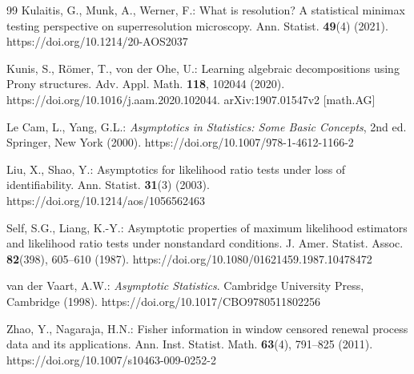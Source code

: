 \begin{thebibliography}{99}
Kulaitis, G., Munk, A., Werner, F.: What is resolution? A statistical minimax
testing perspective on superresolution microscopy. Ann. Statist.
\textbf{49}(4) (2021). https://doi.org/10.1214/20-AOS2037

Kunis, S., R\"omer, T., von der Ohe, U.: Learning algebraic decompositions
using Prony structures. Adv. Appl. Math. \textbf{118}, 102044 (2020).
https://doi.org/10.1016/j.aam.2020.102044. arXiv:1907.01547v2 [math.AG]

Le Cam, L., Yang, G.L.: \emph{Asymptotics in Statistics: Some Basic
Concepts}, 2nd ed. Springer, New York (2000).
https://doi.org/10.1007/978-1-4612-1166-2

Liu, X., Shao, Y.: Asymptotics for likelihood ratio tests under loss of
identifiability. Ann. Statist. \textbf{31}(3) (2003).
https://doi.org/10.1214/aos/1056562463

Self, S.G., Liang, K.-Y.: Asymptotic properties of maximum likelihood
estimators and likelihood ratio tests under nonstandard conditions.
J. Amer. Statist. Assoc. \textbf{82}(398), 605--610 (1987).
https://doi.org/10.1080/01621459.1987.10478472

van der Vaart, A.W.: \emph{Asymptotic Statistics}. Cambridge University
Press, Cambridge (1998). https://doi.org/10.1017/CBO9780511802256

Zhao, Y., Nagaraja, H.N.: Fisher information in window censored renewal
process data and its applications. Ann. Inst. Statist. Math. \textbf{63}(4),
791--825 (2011). https://doi.org/10.1007/s10463-009-0252-2

\end{thebibliography}
